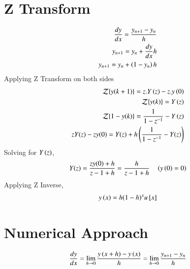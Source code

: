 \documentclass[journal,12pt,onecolumn]{IEEEtran}
\theoremstyle{remark}
\begin{document}
\section{Z Transform}
\begin{align*}
  \frac{dy}{dx}=\frac{{}y_{n+1}-y_{n}}{h}\\
  y_{n+1}=y_{n}+\frac{dy}{dx}h\\
  y_{n+1}=y_{n}+\left(1-y_{n}\right)h\\
\end{align*}
Applying Z Transform on both sides\\
\begin{align*}
    \mathcal{Z}\{y(k+1)\} = z.Y\left(z\right)-z.y\left(0\right)\\
    \mathcal{Z}\{y(k)\}=Y\left(z\right)\\
    \mathcal{Z}\{1-y(k)\}=\frac{1}{1-z^{-1}}-Y\left(z\right)\\
    z Y(z) - z y(0) = Y(z) + h \left( \frac{1}{1 - z^{-1}} - Y(z) \right)\\
\end{align*}
Solving for $Y\left(z\right)$,\\
\begin{align*}
    Y(z) = \frac{z y(0) + h}{z - 1 + h}=\frac{h}{z - 1 + h} \quad \left(y\left(0\right)=0\right)
\end{align*}
Applying Z Inverse,
\begin{align*}
y\left(x\right)=h(1-h)^{x}u{}\left[x\right]
\end{align*}
\section{Numerical Approach}
\begin{align*}
\frac{dy}{dx}=\lim_{h \rightarrow 0} \frac{y\left(x+h\right)-y\left(x\right)}{h}
=\lim_{h \rightarrow 0}\frac{{}y_{n+1}-y_{n}}{h}
\end{align*}
\end{document}
